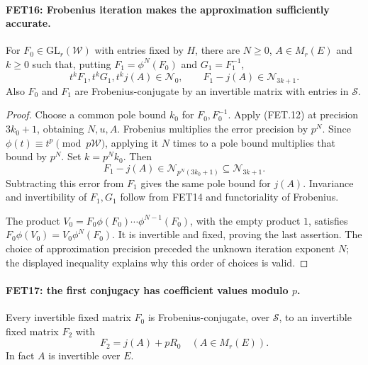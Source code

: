 \paragraph{FET16: Frobenius iteration makes the approximation sufficiently accurate.}
\label{claim:FET16}
For $F_0\in\mathrm{GL}_r(\mathcal W)$ with entries fixed by
$H$, there are $N\geq0$, $A\in M_r(E)$ and $k\geq0$ such that,
putting $F_1=\phi^N(F_0)$ and $G_1=F_1^{-1}$,
\[
 t^k F_1, t^kG_1, t^k j(A)\in\mathcal N_0,\qquad
                       F_1-j(A)\in\mathcal N_{3k+1}.
                                                               \tag{FET.14}
\]
Also $F_0$ and $F_1$ are Frobenius-conjugate by an invertible
matrix with entries in $\mathcal S$.

\begin{proof}
Choose a common pole bound $k_0$ for $F_0,F_0^{-1}$.
Apply (FET.12) at precision $3k_0+1$, obtaining $N,u,A$.
Frobenius multiplies the error precision by $p^N$.
Since $\phi(t)\equiv t^p\pmod {p\mathcal W}$, applying it
$N$ times to a pole bound multiplies that bound by $p^N$.
Set $k=p^N k_0$. Then
\[
 F_1-j(A)\in\mathcal N_{p^N(3k_0+1)}
                        \subseteq\mathcal N_{3k+1}.
\]
Subtracting this error from $F_1$ gives the same pole bound
for $j(A)$. Invariance and invertibility of $F_1,G_1$ follow
from FET14 and functoriality of Frobenius.

The product
$V_0=F_0\phi(F_0)\cdots\phi^{N-1}(F_0)$, with the empty
product $1$, satisfies
$F_0\phi(V_0)=V_0\phi^N(F_0)$.
It is invertible and fixed, proving the last assertion.
The choice of approximation precision preceded the unknown
iteration exponent $N$; the displayed inequality explains why
this order of choices is valid.
\end{proof}

\paragraph{FET17: the first conjugacy has coefficient values modulo $p$.}
\label{claim:FET17}
Every invertible fixed matrix $F_0$ is Frobenius-conjugate,
over $\mathcal S$, to an invertible fixed matrix $F_2$ with
\[
                              F_2=j(A)+pR_0
                             \quad(A\in M_r(E)).           \tag{FET.15}
\]
In fact $A$ is invertible over $E$.

